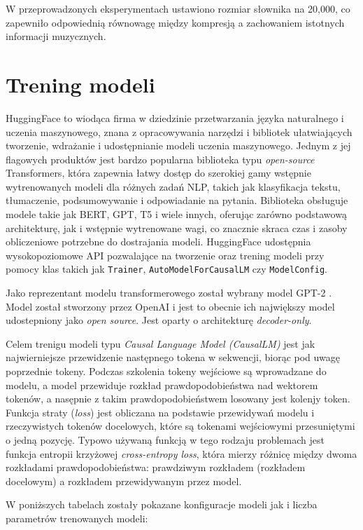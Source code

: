 \documentclass[data-science]{agh-wi} %
\begin{document}
W przeprowadzonych eksperymentach ustawiono rozmiar słownika na 20,000, co zapewniło odpowiednią równowagę między kompresją a zachowaniem istotnych informacji muzycznych.

\section{Trening modeli}
HuggingFace to wiodąca firma w dziedzinie przetwarzania języka naturalnego i uczenia maszynowego, znana z opracowywania narzędzi i bibliotek ułatwiających tworzenie, wdrażanie i udostępnianie modeli uczenia maszynowego. Jednym z jej flagowych produktów jest bardzo popularna biblioteka typu \textit{open-source} Transformers, która zapewnia łatwy dostęp do szerokiej gamy wstępnie wytrenowanych modeli dla różnych zadań NLP, takich jak klasyfikacja tekstu, tłumaczenie, podsumowywanie i odpowiadanie na pytania. Biblioteka obsługuje modele takie jak BERT, GPT, T5 i wiele innych, oferując zarówno podstawową architekturę, jak i wstępnie wytrenowane wagi, co znacznie skraca czas i zasoby obliczeniowe potrzebne do dostrajania modeli. HuggingFace udostępnia wysokopoziomowe API pozwalające na tworzenie oraz trening modeli przy pomocy klas takich jak \texttt{Trainer}, \texttt{AutoModelForCausalLM} czy \texttt{ModelConfig}.

Jako reprezentant modelu transformerowego został wybrany model GPT-2 \cite{gpt2}. Model został stworzony przez OpenAI i jest to obecnie ich największy model udostepniony jako \textit{open source}. Jest oparty o architekturę \textit{decoder-only}.

Celem trenigu modeli typu \textit{Causal Language Model (CausalLM)} jest jak najwierniejsze przewidzenie następnego tokena w sekwencji, biorąc pod uwagę poprzednie tokeny. Podczas szkolenia tokeny wejściowe są wprowadzane do modelu, a model przewiduje rozkład prawdopodobieństwa nad wektorem tokenów, a nasępnie z takim prawdopodobieństwem losowany jest kolenjy token. Funkcja straty (\textit{loss}) jest obliczana na podstawie przewidywań modelu i rzeczywistych tokenów docelowych, które są tokenami wejściowymi przesuniętymi o jedną pozycję. Typowo używaną funkcją w tego rodzaju problemach jest funkcja entropii krzyżowej \textit{cross-entropy loss}, która mierzy różnicę między dwoma rozkładami prawdopodobieństwa: prawdziwym rozkładem (rozkładem docelowym) a rozkładem przewidywanym przez model.

W poniższych tabelach zostały pokazane konfiguracje modeli jak i liczba parametrów trenowanych modeli:
\end{document}
